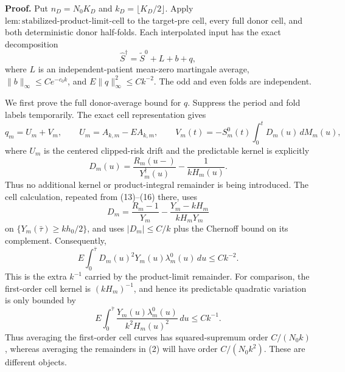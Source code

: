 \textbf{Proof.}
Put \(n_D=N_0K_D\) and \(k_D=\lfloor K_D/2\rfloor\).  Apply
\(\mathrm{lem:stabilized\mbox{-}product\mbox{-}limit\mbox{-}cell}\) to
the target-pre cell, every full donor cell, and both deterministic donor
half-folds.  Each interpolated input has the exact decomposition
\[
 \widehat S^\dagger=\widetilde S^0+L+b+q,                \tag{1}
\]
where \(L\) is an independent-patient mean-zero martingale average,
\(\|b\|_\infty\leq Ce^{-c_0k}\), and
\(E\|q\|_\infty^2\leq Ck^{-2}\).  The odd and even folds are independent.

We first prove the full donor-average bound for \(q\).  Suppress the period
and fold labels temporarily.  The exact cell representation gives
\[
 q_m=U_m+V_m,
 \qquad
 U_m=A_{k,m}-EA_{k,m},
 \qquad
 V_m(t)=-S_m^0(t)\int_0^tD_m(u)\,dM_m(u),                \tag{2}
\]
where \(U_m\) is the centered clipped-risk drift and the predictable kernel
is explicitly
\[
 D_m(u)=\frac{R_m(u-)}{Y_m^\dagger(u)}-\frac{1}{kH_m(u)}.
                                                                    \tag{3}
\]
Thus no additional kernel or product-integral remainder is being introduced.
The cell calculation, repeated from (13)--(16) there, uses
\[
 D_m=\frac{R_m-1}{Y_m}
     -\frac{Y_m-kH_m}{kH_mY_m}
\]
on \(\{Y_m(\bar\tau)\geq kh_0/2\}\), and uses
\(|D_m|\leq C/k\) plus the Chernoff bound on its complement.  Consequently,
\[
 E\int_0^{\bar\tau}D_m(u)^2Y_m(u)\lambda_m^0(u)\,du
 \leq Ck^{-2}.                                           \tag{4}
\]
This is the extra \(k^{-1}\) carried by the product-limit remainder.  For
comparison, the first-order cell kernel is \((kH_m)^{-1}\), and hence its
predictable quadratic variation is only bounded by
\[
 E\int_0^{\bar\tau}\frac{Y_m(u)\lambda_m^0(u)}
 {k^2H_m(u)^2}\,du\leq Ck^{-1}.                          \tag{5}
\]
Thus averaging the first-order cell curves has squared-supremum order
\(C/(N_0k)\), whereas averaging the remainders in (2) will have order
\(C/(N_0k^2)\).  These are different objects.

